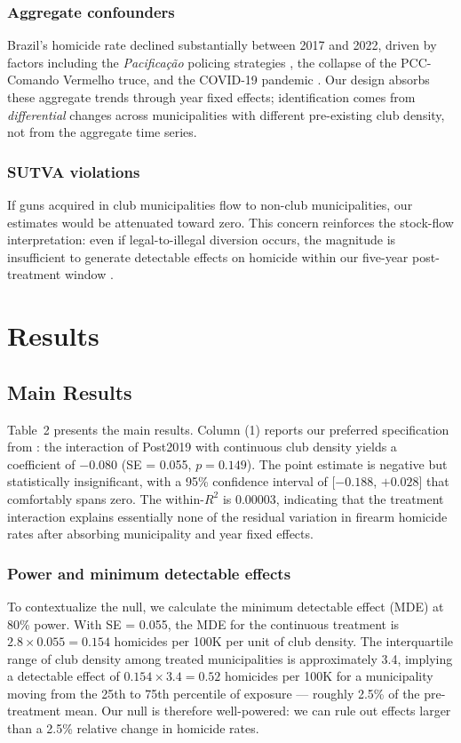 \documentclass[12pt]{article}
\begin{document}
\subsubsection*{Aggregate confounders} Brazil's homicide rate declined substantially between 2017 and 2022, driven by factors including the \textit{Pacifica\c{c}\~{a}o} policing strategies \citep{ditellaschargrodsky2004}, the collapse of the PCC-Comando Vermelho truce, and the COVID-19 pandemic \citep{cook2009guns}. Our design absorbs these aggregate trends through year fixed effects; identification comes from \textit{differential} changes across municipalities with different pre-existing club density, not from the aggregate time series.

\subsubsection*{SUTVA violations} If guns acquired in club municipalities flow to non-club municipalities, our estimates would be attenuated toward zero. This concern reinforces the stock-flow interpretation: even if legal-to-illegal diversion occurs, the magnitude is insufficient to generate detectable effects on homicide within our five-year post-treatment window \citep{knight2013guntrace}.


\section{Results}
\label{sec:results}

\subsection{Main Results}

Table~2 presents the main results. Column (1) reports our preferred specification from : the interaction of Post2019 with continuous club density yields a coefficient of $-0.080$ (SE = 0.055, $p = 0.149$). The point estimate is negative but statistically insignificant, with a 95\% confidence interval of [$-0.188$, $+0.028$] that comfortably spans zero. The within-$R^2$ is 0.00003, indicating that the treatment interaction explains essentially none of the residual variation in firearm homicide rates after absorbing municipality and year fixed effects.

\subsubsection*{Power and minimum detectable effects} To contextualize the null, we calculate the minimum detectable effect (MDE) at 80\% power. With SE = 0.055, the MDE for the continuous treatment is $2.8 \times 0.055 = 0.154$ homicides per 100K per unit of club density. The interquartile range of club density among treated municipalities is approximately 3.4, implying a detectable effect of $0.154 \times 3.4 = 0.52$ homicides per 100K for a municipality moving from the 25th to 75th percentile of exposure --- roughly 2.5\% of the pre-treatment mean. Our null is therefore well-powered: we can rule out effects larger than a 2.5\% relative change in homicide rates.
\end{document}
